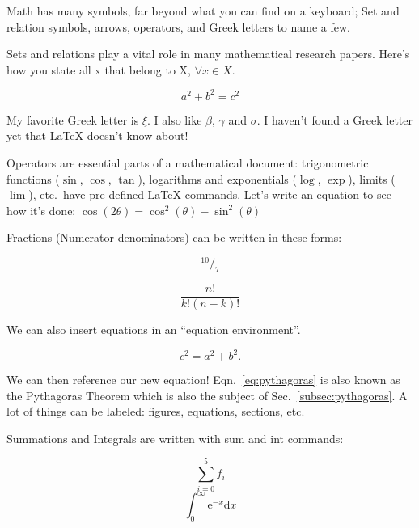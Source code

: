 \documentclass[12pt]{article}
\begin{document}
Math has many symbols, far beyond what you can find on a keyboard;
Set and relation symbols, arrows, operators, and Greek letters to name a few.

Sets and relations play a vital role in many mathematical research papers.
Here's how you state all x that belong to X, $\forall x \in X$.

\[a^2 + b^2 = c^2 \]

My favorite Greek letter is $\xi$. I also like $\beta$, $\gamma$ and $\sigma$.
I haven't found a Greek letter yet that \LaTeX{} doesn't know
about!

Operators are essential parts of a mathematical document:
trigonometric functions ($\sin$, $\cos$, $\tan$),
logarithms and exponentials ($\log$, $\exp$),
limits ($\lim$), etc.~have pre-defined LaTeX commands.
Let's write an equation to see how it's done:
$\cos(2\theta) = \cos^{2}(\theta) - \sin^{2}(\theta)$

Fractions (Numerator-denominators) can be written in these forms:

$$ ^{10}/_{7} $$

$$ \frac{n!}{k!(n - k)!} $$

We can also insert equations in an ``equation environment''.

\begin{equation} %
    c^2 = a^2 + b^2.
    \label{eq:pythagoras} %
\end{equation} %

We can then reference our new equation!
Eqn.~\ref{eq:pythagoras} is also known as the Pythagoras Theorem which is also
the subject of Sec.~\ref{subsec:pythagoras}. A lot of things can be labeled:
figures, equations, sections, etc.

Summations and Integrals are written with sum and int commands:

\begin{equation}
  \sum_{i=0}^{5} f_{i}
\end{equation}
\begin{equation}
  \int_{0}^{\infty} \mathrm{e}^{-x} \mathrm{d}x
\end{equation}
\end{document}

